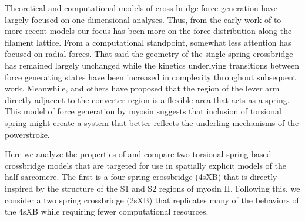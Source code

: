 \documentclass[]{article}
\begin{document}


Theoretical and computational models of cross-bridge force generation have largely focused on one-dimensional analyses. 
Thus, from the early work of \citet{Huxley:1957:p255} to more recent models \citep{Daniel:1998:p1611, Chase:2004:p204, Tanner:2007:pe115} our focus has been more on the force distribution along the filament lattice.  
From a computational standpoint, somewhat less attention has focused on radial forces. 
That said the geometry of the single spring crossbridge has remained largely unchanged while the kinetics underlying transitions between force generating states have been increased in complexity throughout subsequent work. \citep{Pate:1989:p181, Daniel:1998:p1611, Tanner:2007:pe115}
Meanwhile, \citet{Houdusse:2001:p182} and others have proposed that the region of the lever arm directly adjacent to the converter region is a flexible area that acts as a spring. 
This model of force generation by myosin suggests that inclusion of torsional spring might create a system that better reflects the underling mechanisms of the powerstroke. 

Here we analyze the properties of and compare two torsional spring based crossbridge models that are targeted for use in spatially explicit models of the half sarcomere. 
The first is a four spring crossbridge (4sXB) that is directly inspired by the structure of the S1 and S2 regions of myosin II. 
Following this, we consider a two spring crossbridge (2sXB) that replicates many of the behaviors of the 4sXB while requiring fewer computational resources.
\end{document}
